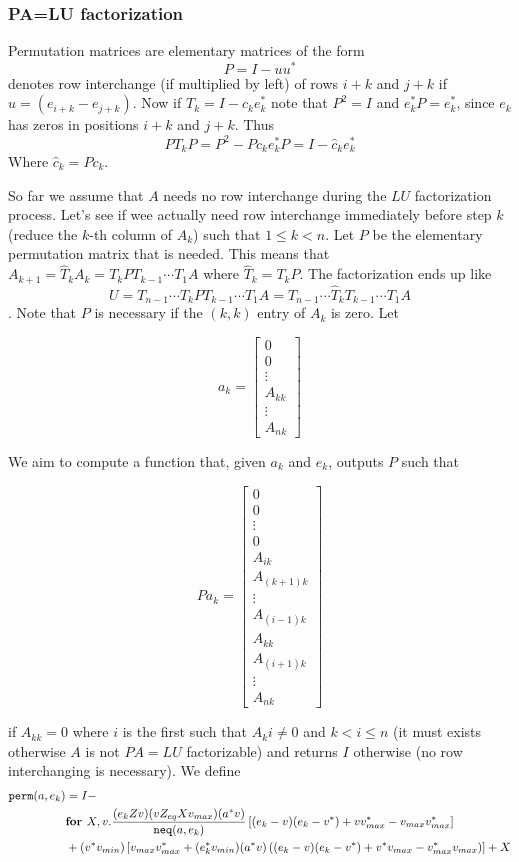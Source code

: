 \subsubsection{PA=LU factorization}

Permutation matrices are elementary matrices of the form $$P=I-uu^*$$ denotes row interchange (if multiplied by left) of rows $i+k$ and $j+k$ if $u=(e_{i+k}-e_{j+k})$. Now if $T_{k} = I-c_ke_k^*$ note that $P^2=I$ and $e_k^*P=e_k^*$, since $e_{k}$ has zeros in positions $i+k$ and $j+k$. Thus $$PT_kP=P^2-Pc_ke_k^*P=I-\widehat{c}_ke_k^*$$ Where $\widehat{c}_k=Pc_k$.

So far we assume that $A$ needs no row interchange during the $LU$ factorization process. Let's see if wee actually need row interchange immediately before step $k$ (reduce the $k$-th column of $A_{k}$) such that $1 \leq k < n$. Let $P$ be the elementary permutation matrix that is needed. This means that $A_{k+1}=\widehat{T}_kA_k=T_kPT_{k-1}\cdots T_1A$ where $\widehat{T}_k=T_{k}P$. The factorization ends up like $$U=T_{n-1}\cdots T_{k}PT_{k-1}\cdots T_1A = T_{n-1}\cdots \widehat{T}_{k}T_{k-1}\cdots T_1A$$. Note that $P$ is necessary if the $(k,k)$ entry of $A_{k}$ is zero. Let 

\[
a_k = 
\begin{bmatrix}
    0 \\
    0 \\
    \vdots \\
    A_{kk} \\
     \vdots \\
    A_{nk}
\end{bmatrix}
\]

We aim to compute a function that, given $a_k$ and $e_k$, outputs $P$ such that

\[
Pa_k = 
\begin{bmatrix}
    0 \\
    0 \\
    \vdots \\
    0 \\
    A_{ik} \\
    A_{(k+1)k}\\
    \vdots \\
    A_{(i-1)k} \\
    A_{kk} \\
    A_{(i+1)k} \\
    \vdots \\
    A_{nk}
\end{bmatrix}
\]

if $A_{kk}=0$ where $i$ is the first such that $A_ki\neq 0$ and $k<i\leq n$ (it must exists otherwise $A$ is not $PA=LU$ factorizable) and returns $I$ otherwise (no row interchanging is necessary). We define
\begin{align*}
\texttt{perm}(a,e_k)&=I - \\
 &\textbf{for } X,v. \dfrac{(e_kZv)(vZ_{eq}Xv_{max})(a^*v)}{\texttt{neq}(a, e_k)}\left[ (e_k-v)(e_k-v^*)+vv_{max}^*-v_{max}v_{max}^*\right] \\
 & + (v^*v_{min})\left[  v_{max}v_{max}^* + (e_k^*v_{min})(a^*v)\left( (e_k-v)(e_k-v^*) + v^*v_{max} - v_{max}^*v_{max} \right) \right] + X
\end{align*}


